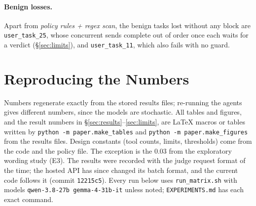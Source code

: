 \paragraph{Benign losses.} Apart from \emph{policy rules + regex scan}, the benign tasks lost without any block are
\texttt{user\_task\_25}, whose concurrent sends complete out of order once each waits for a
verdict (\S\ref{sec:limits}), and \texttt{user\_task\_11}, which also fails with no guard.

\section{Reproducing the Numbers}\label{app:repro}

Numbers regenerate exactly from the stored results files; re-running the agents gives
different numbers, since the models are stochastic. All tables and figures, and the result numbers in \S\ref{sec:results}--\ref{sec:limits}, are
LaTeX macros or tables written by \texttt{python -m paper.make\_tables} and
\texttt{python -m paper.make\_figures} from the results files. Design constants (tool counts,
limits, thresholds) come from the code and the policy file. The exception is the 0.03 from the
exploratory wording study (E3). The results were recorded with the judge request format of the
time; the hosted \dthree API has since changed its batch format, and the current code follows
it (commit \texttt{12215c5}). Every run below uses \texttt{run\_matrix.sh} with models
\texttt{qwen-3.8-27b gemma-4-31b-it} unless noted; \texttt{EXPERIMENTS.md} has each exact
command.\smallskip


